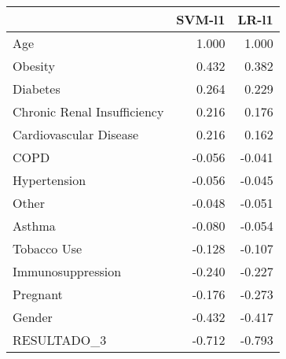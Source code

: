\begin{tabular}{lrr}
\toprule
{} &  SVM-l1 &  LR-l1 \\
\midrule
Age                         &   1.000 &  1.000 \\
Obesity                     &   0.432 &  0.382 \\
Diabetes                    &   0.264 &  0.229 \\
Chronic Renal Insufficiency &   0.216 &  0.176 \\
Cardiovascular Disease      &   0.216 &  0.162 \\
COPD                        &  -0.056 & -0.041 \\
Hypertension                &  -0.056 & -0.045 \\
Other                       &  -0.048 & -0.051 \\
Asthma                      &  -0.080 & -0.054 \\
Tobacco Use                 &  -0.128 & -0.107 \\
Immunosuppression           &  -0.240 & -0.227 \\
Pregnant                    &  -0.176 & -0.273 \\
Gender                      &  -0.432 & -0.417 \\
RESULTADO\_3                 &  -0.712 & -0.793 \\
\bottomrule
\end{tabular}
